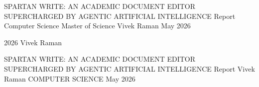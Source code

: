 
\thesistitlepage
    {SPARTAN WRITE: AN ACADEMIC DOCUMENT EDITOR\\
     SUPERCHARGED BY AGENTIC ARTIFICIAL INTELLIGENCE}
    {Report}                 %
    {Computer Science}            %
    {Master of Science}         %
    {Vivek Raman}        %
    {May 2026}          %

\copyrightpage
    {2026}                   %
    {Vivek Raman}            %

\signaturepage
    {SPARTAN WRITE: AN ACADEMIC DOCUMENT EDITOR\\
     SUPERCHARGED BY AGENTIC ARTIFICIAL INTELLIGENCE}
    {Report}                 %
    {Vivek Raman}        %
    {COMPUTER SCIENCE}             %
    {May 2026}            %
    {%
    }
